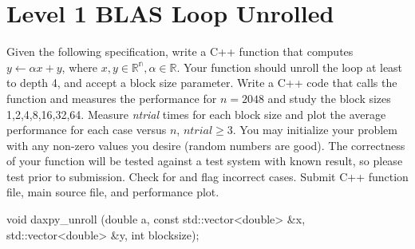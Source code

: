 \documentclass[12pt]{article}
\begin{document}
\section{Level 1 BLAS Loop Unrolled}
\begin{mdframed}
    Given the following specification, write a C++ function that computes $y \leftarrow \alpha x + y$, 
    where $x,y \in \mathbb{R^n}, \alpha \in \mathbb{R}$. Your function should unroll the loop at least 
    to depth 4, and accept a block size parameter. Write a C++ code that calls the function
    and measures the performance for $n=2048$ and study the block sizes 1,2,4,8,16,32,64. 
    Measure \textit{ntrial} times for each block size and plot the average performance for each case 
    versus $n$, $ntrial \geq 3$. You may initialize your problem with any non-zero values you desire 
    (random numbers are good). The correctness of your function will be tested against a test system 
    with known result, so please test prior to submission. Check for and flag incorrect cases. 
    Submit C++ function file, main source file, and performance plot.
    \begin{verbnobox}[\small]
        void daxpy_unroll (double a, const std::vector<double> &x, 
        std::vector<double> &y, int blocksize);
    \end{verbnobox}
\end{mdframed}
\end{document}
